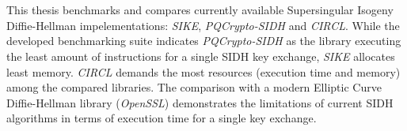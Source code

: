 \chapter{\abstractname}

This thesis benchmarks and compares currently available Supersingular Isogeny Diffie-Hellman impelementations: \textit{SIKE}, \textit{PQCrypto-SIDH} and \textit{CIRCL}. While the developed benchmarking suite indicates \textit{PQCrypto-SIDH} as the library executing the least amount of instructions for a single SIDH key exchange, \textit{SIKE} allocates least memory. \textit{CIRCL} demands the most resources (execution time and memory) among the compared libraries. The comparison with a modern Elliptic Curve Diffie-Hellman library (\textit{OpenSSL}) demonstrates the limitations of current SIDH algorithms in terms of execution time for a single key exchange.



